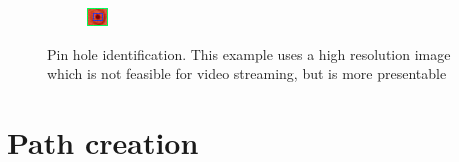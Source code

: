\documentclass[11pt,a4paper, margin=1in]{report}
\begin{document}
\begin{figure}
			\begin{subfigure}{0.3\linewidth}
				\centering
				\includegraphics[width=0.7\linewidth]{"pin hole3"}
				\label{fig:pin3}
			\end{subfigure}
\caption{Pin hole identification. This example uses a high resolution image which is not feasible for video streaming, but is more presentable}
\label{fig:pinhole3}
\end{figure}

\FloatBarrier

\section{Path creation}
\end{document}

